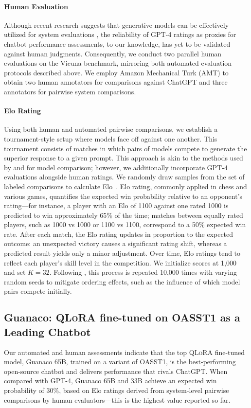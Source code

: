 \paragraph{Human Evaluation} Although recent research suggests that generative models can be effectively utilized for system evaluations \citep{fu2023gptscore}, the reliability of GPT-4 ratings as proxies for chatbot performance assessments, to our knowledge, has yet to be validated against human judgments. Consequently, we conduct two parallel human evaluations on the Vicuna benchmark, mirroring both automated evaluation protocols described above. We employ Amazon Mechanical Turk (AMT) to obtain two human annotators for comparisons against ChatGPT and three annotators for pairwise system comparisons.

\paragraph{Elo Rating} Using both human and automated pairwise comparisons, we establish a tournament-style setup where models face off against one another. This tournament consists of matches in which pairs of models compete to generate the superior response to a given prompt. This approach is akin to the methods used by \citet{bai2022training} and \citet{vicuna2023} for model comparison; however, we additionally incorporate GPT-4 evaluations alongside human ratings. We randomly draw samples from the set of labeled comparisons to calculate Elo~\citep{elo1967proposed,elo1978rating}. Elo rating, commonly applied in chess and various games, quantifies the expected win probability relative to an opponent's rating—for instance, a player with an Elo of 1100 against one rated 1000 is predicted to win approximately 65\% of the time; matches between equally rated players, such as 1000 vs 1000 or 1100 vs 1100, correspond to a 50\% expected win rate. After each match, the Elo rating updates in proportion to the expected outcome: an unexpected victory causes a significant rating shift, whereas a predicted result yields only a minor adjustment. Over time, Elo ratings tend to reflect each player's skill level in the competition. We initialize scores at 1,000 and set $K=32$. Following \citet{vicuna2023}, this process is repeated 10,000 times with varying random seeds to mitigate ordering effects, such as the influence of which model pairs compete initially.

\subsection{\textbf{Guanaco}: \textsc{QLoRA} fine-tuned on OASST1 as a Leading Chatbot} Our automated and human assessments indicate that the top \textsc{QLoRA} fine-tuned model, {Guanaco} 65B, trained on a variant of OASST1, is the best-performing open-source chatbot and delivers performance that rivals ChatGPT. When compared with GPT-4, {Guanaco} 65B and 33B achieve an expected win probability of 30\%, based on Elo ratings derived from system-level pairwise comparisons by human evaluators—this is the highest value reported so far.

